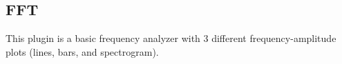\subsection{FFT}
This plugin is a basic frequency analyzer with 3 different frequency-amplitude
plots (lines, bars, and spectrogram).
